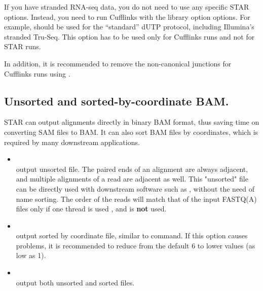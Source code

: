 \documentclass[12pt]{article}
\begin{document}
If you have stranded RNA-seq data, you do not need to use any specific STAR options. Instead, you need to run Cufflinks with the library option  options. For example,  should be used for the “standard” dUTP protocol, including Illumina's stranded Tru-Seq. This option has to be used only for Cufflinks runs and not for STAR runs.

In addition, it is recommended to remove the non-canonical junctions for Cufflinks runs using  .

\subsection{Unsorted and sorted-by-coordinate BAM.}
STAR can output alignments directly in binary BAM format, thus saving time on converting SAM files to BAM. It can also sort BAM files by coordinates, which is required by many downstream applications.
\begin{itemize}
\raggedright
\item[]
 \\
output unsorted  file. The paired ends of an alignment are always adjacent, and multiple alignments of a read are adjacent as well. This "unsorted" file can be directly used with downstream software such as , without the need of name sorting. The order of the reads will match that of the input FASTQ(A) files only if one thread is used  , and   is \textbf{not} used.
\item[]
 \\
output sorted by coordinate  file, similar to  command. If this option causes problems, it is recommended to reduce  from the default $6$ to lower values (as low as 1).
\item[]
 \\
output both unsorted and sorted files.
\end{itemize}
\end{document}
